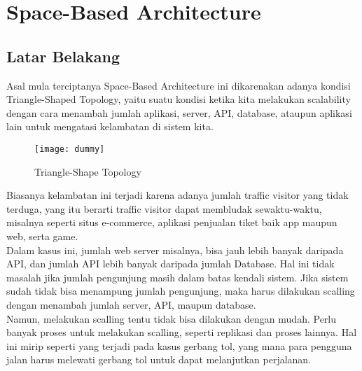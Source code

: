 %
	\chapter{Space-Based Architecture}
	\section*{\huge{Latar Belakang}}
	\large Asal mula terciptanya Space-Based Architecture ini dikarenakan adanya kondisi Triangle-Shaped Topology, yaitu suatu kondisi ketika kita melakukan scalability dengan cara menambah jumlah aplikasi, server, API, database, ataupun aplikasi lain untuk mengatasi kelambatan di sistem kita.\\
	\vskip0.15cm
	\begin{figure}
		\centering
		\texttt{[image: dummy]}
		\caption{Triangle-Shape Topology}
	\end{figure}
	\vskip0.15cm
	Biasanya kelambatan ini terjadi karena adanya jumlah traffic visitor yang tidak terduga, yang itu berarti traffic visitor dapat membludak sewaktu-waktu, misalnya seperti situs e-commerce, aplikasi penjualan tiket baik app maupun web, serta game.\\
	
	Dalam kasus ini, jumlah web server misalnya, bisa jauh lebih banyak daripada API, dan jumlah API lebih banyak daripada jumlah Database. Hal ini tidak masalah jika jumlah pengunjung masih dalam batas kendali sistem. Jika sistem sudah tidak bisa menampung jumlah pengunjung, maka harus dilakukan scalling dengan menambah jumlah server, API, maupun database.\\
	
	Namun, melakukan scalling tentu tidak bisa dilakukan dengan mudah. Perlu banyak proses untuk melakukan scalling, seperti replikasi dan proses lainnya. Hal ini mirip seperti yang terjadi pada kasus gerbang tol, yang mana para pengguna jalan harus melewati gerbang tol untuk dapat melanjutkan perjalanan.\\
	
